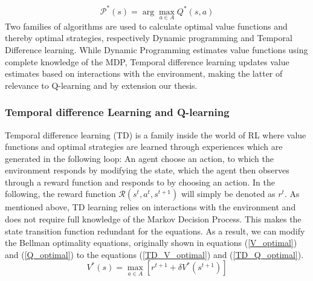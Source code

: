 \documentclass{article}
\begin{document}
\begin{equation}
    \label{Optimal_strategy}
    \mathcal{P}^*(s) =  \arg \max_{a \in A}Q^*(s,a)
\end{equation}
Two families of algorithms are used to calculate optimal value functions and thereby optimal strategies, respectively Dynamic programming and Temporal Difference learning. While Dynamic Programming estimates value functions using complete knowledge of the MDP, Temporal difference learning updates value estimates based on interactions with the environment, making the latter of relevance to Q-learning and by extension our thesis. 
\citep[p. 26-28]{marl-book}
\subsubsection{Temporal difference Learning and Q-learning}
\label{Temporal Difference Learning and Q-learning}
Temporal difference learning (TD) is a family inside the world of RL where value functions and optimal strategies are learned through experiences which are generated in the following loop: An agent choose an action, to which the environment responds by modifying the state, which the agent then observes through a reward function and responds to by choosing an action. In the following, the reward function $\mathcal{R}(s^t,a^t,s^{t+1})$ will simply be denoted as $r^t$. As mentioned above, TD learning relies on interactions with the environment and does not require full knowledge of the Markov Decision Process. This makes the state transition function redundant for the equations. As a result, we can modify the Bellman optimality equations, originally shown in equations (\ref{V_optimal}) and (\ref{Q_optimal}) to the equations (\ref{TD_V_optimal}) and (\ref{TD_Q_optimal}).
\begin{equation}
    \label{TD_V_optimal}
        V^*(s) = \max_{a\in A}[r^{t+1}+\delta V^*(s^{t+1})]
\end{equation}
\end{document}

